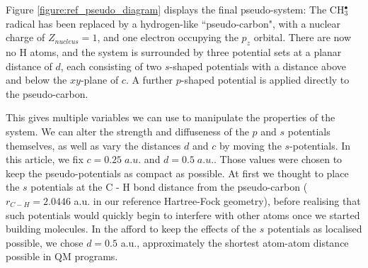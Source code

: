 \documentclass[12pt]{article}
\begin{document}

Figure \ref{figure:ref_pseudo_diagram} displays the final pseudo-system: The CH\(^{\bullet}_{3}\) radical has been replaced by a hydrogen-like ``pseudo-carbon", with a nuclear charge of \(Z_{nucleus} = 1\), and one electron occupying the \(p_{z}\) orbital. 
There are now no H atoms, and the system is surrounded by three potential sets at a planar distance of \(d\), each consisting of 
two \(s\)-shaped potentials with a distance above and below the \(xy\)-plane of \(c\). A further \(p\)-shaped potential is applied
directly to the pseudo-carbon.

This gives multiple variables we can use to manipulate the properties of the system.
We can alter the strength and diffuseness of the \(p\) and \(s\) potentials themselves,
as well as vary the distances \(d\) and \(c\) by moving the \(s\)-potentials.
In this article, we fix \(c = 0.25\;a.u.\) and \(d = 0.5\;a.u.\).
Those values were chosen to keep the pseudo-potentials as compact as possible.
At first we thought to place the $s$ potentials at the C - H bond distance from the pseudo-carbon ($r_{C - H} = 2.0446$ a.u. 
in our reference Hartree-Fock geometry), before realising that such potentials would quickly begin to interfere with other 
atoms once we started building molecules. In the afford to keep the effects 
of the $s$ potentials as localised possible, we chose $d=0.5$ a.u., approximately the shortest atom-atom distance possible in 
QM programs.


\end{document}
